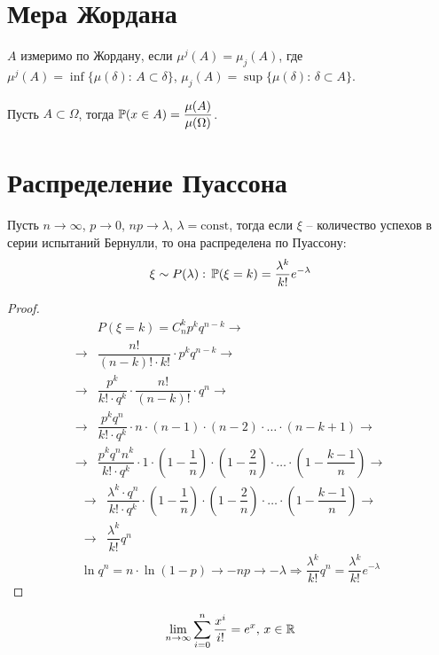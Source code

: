 \documentclass[12pt]{article}
\begin{document}
\section{Мера Жордана}
\begin{definition}
    $A$ измеримо по Жордану, если $\mu^j(A)=\mu_j(A)$, где $\mu^j(A)=\inf\{\mu(\delta):\,A\subset \delta\}$, $\mu_j(A)=\sup\{\mu(\delta):\,\delta \subset A\}$.
\end{definition}
\begin{definition}
    Пусть $A\subset \Omega$, тогда $\mathbb{P}(x\in A)=\dfrac{\mu(A)}{\mu(\Omega)}$.
\end{definition}

\section{Распределение Пуассона}
\begin{theorem}
    Пусть $n\to\infty$, $p\to 0$, $np\to \lambda$, $\lambda=\text{const}$, тогда если $\xi$ -- количество успехов в серии испытаний Бернулли, то она распределена по Пуассону:
    $$\xi \sim P(\lambda):\,\mathbb{P}(\xi=k)=\dfrac{\lambda^k}{k!}e^{-\lambda}$$
\end{theorem}
\begin{proof}
    \begin{align*}
        &P(\xi=k)=C_n^kp^kq^{n-k}\to\\
        \to&\dfrac{n!}{(n-k)!\cdot k!}\cdot p^kq^{n-k}\to\\
        \to&\dfrac{p^k}{k!\cdot q^k}\cdot \dfrac{n!}{(n-k)!}\cdot q^n\to\\
        \to&\dfrac{p^kq^n}{k!\cdot q^k}\cdot n\cdot(n-1)\cdot(n-2)\cdot\ldots\cdot(n-k+1)\to\\
        \to&\dfrac{p^kq^nn^k}{k!\cdot q^k}\cdot 1\cdot\left(1-\dfrac{1}{n}\right)\cdot\left(1-\dfrac{2}{n}\right)\cdot\ldots\cdot\left(1-\dfrac{k-1}{n}\right)\to
    \end{align*}
    \begin{align*}
        \to&\dfrac{\lambda^k\cdot q^n}{k!\cdot q^k}\cdot\left(1-\dfrac{1}{n}\right)\cdot\left(1-\dfrac{2}{n}\right)\cdot\ldots\cdot\left(1-\dfrac{k-1}{n}\right)\to\\
        \to&\dfrac{\lambda^k}{k!}q^n
    \end{align*}
    $$\ln q^n= n\cdot \ln(1-p)\to -np\to-\lambda \Longrightarrow \dfrac{\lambda^k}{k!}q^n = \dfrac{\lambda^k}{k!}e^{-\lambda}$$
\end{proof}
\begin{theorem}
    $$\lim_{n\to\infty}\sum_{i=0}^n\dfrac{x^i}{i!}=e^x,\,x\in \mathbb{R}$$
\end{theorem}
\end{document}
